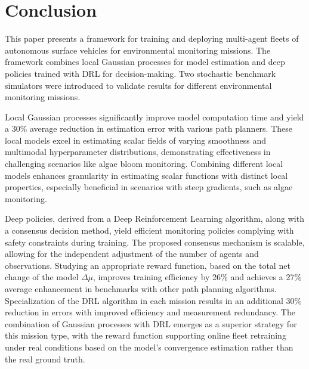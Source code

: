 \documentclass[journal]{IEEEtran}
\begin{document}
\section{Conclusion}



This paper presents a framework for training and deploying multi-agent fleets of autonomous surface vehicles for environmental monitoring missions. The framework combines local Gaussian processes for model estimation and deep policies trained with DRL for decision-making. Two stochastic benchmark simulators were introduced to validate results for different environmental monitoring missions.

Local Gaussian processes significantly improve model computation time and yield a 30\% average reduction in estimation error with various path planners. These local models excel in estimating scalar fields of varying smoothness and multimodal hyperparameter distributions, demonstrating effectiveness in challenging scenarios like algae bloom monitoring. Combining different local models enhances granularity in estimating scalar functions with distinct local properties, especially beneficial in scenarios with steep gradients, such as algae monitoring.

Deep policies, derived from a Deep Reinforcement Learning algorithm, along with a consensus decision method, yield efficient monitoring policies complying with safety constraints during training. The proposed consensus mechanism is scalable, allowing for the independent adjustment of the number of agents and observations. Studying an appropriate reward function, based on the total net change of the model $\Delta \mu$, improves training efficiency by 26\% and achieves a 27\% average enhancement in benchmarks with other path planning algorithms. Specialization of the DRL algorithm in each mission results in an additional 30\% reduction in errors with improved efficiency and measurement redundancy. The combination of Gaussian processes with DRL emerges as a superior strategy for this mission type, with the reward function supporting online fleet retraining under real conditions based on the model's convergence estimation rather than the real ground truth.

\end{document}
